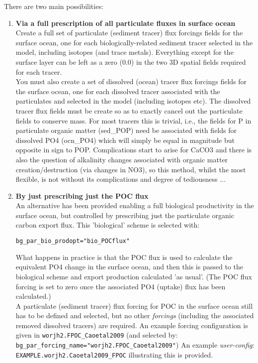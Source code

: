 \documentclass[11pt,fleqn]{book} %
\begin{document}
There are two main possibilities:

\begin{enumerate}[noitemsep]

\vspace{1mm}
        \item \textbf{Via a full prescription of all particulate fluxes in surface ocean}
                \\Create a full set of particulate (sediment tracer) flux forcings fields for the surface ocean, one for each biologically-related sediment tracer selected in the model, including isotopes (and trace metals). Everything except for the surface layer can be left as a zero (0.0) in the two 3D spatial fields required for each tracer.
        \\You must also create a set of dissolved (ocean) tracer flux forcings fields for the surface ocean, one for each dissolved tracer associated with the particulates and selected in the model (including isotopes etc). The dissolved tracer flux fields must be create so as to exactly cancel out the particulate fields to conserve mass. For most tracers this is trivial, i.e., the fields for P in particulate organic matter (sed\_POP) need be associated with fields for dissolved PO4 (ocn\_PO4) which will simply be equal in magnitude but opposite in sign to POP. Complications start to arise for CaCO3 and there is also the question of alkalinity changes associated with organic matter creation/destruction (via changes in NO3), so this method, whilst the most flexible, is not without its complications and degree of tediousness ...

\vspace{1mm}
        \item \textbf{By just prescribing just the POC flux}
                \\An alternative has been provided enabling a full biological productivity in the surface ocean, but controlled by prescribing just the particulate organic carbon export flux. This 'biological' scheme is selected with:
\vspace{-2.5mm}\begin{verbatim}bg_par_bio_prodopt="bio_POCflux"\end{verbatim}\vspace{-2.5mm}
What happens in practice is that the POC flux is used to calculate the equivalent PO4 change in the surface ocean, and then this is passed to the biological scheme and export production calculated 'as usual'. (The POC flux forcing is set to zero once the associated PO4 (uptake) flux has been calculated.)
                \\A particulate (sediment tracer) flux forcing for POC in the surface ocean still has to be defined and selected, but no other \textit{forcings} (including the associated removed dissolved tracers) are required. An example forcing configuration is given in \texttt{worjh2.FPOC\_Caoetal2009} (and selected by: \texttt{bg\_par\_forcing\_name="worjh2.FPOC\_Caoetal2009"})
An example \textit{user-config}: \texttt{EXAMPLE.worjh2.Caoetal2009\_FPOC} illustrating this is provided.


\end{enumerate}
\end{document}
